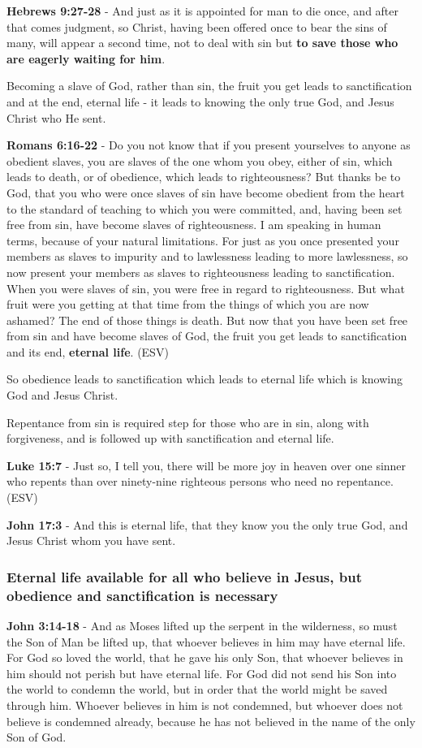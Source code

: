 \documentclass[11pt]{article}
\begin{document}
\textbf{Hebrews 9:27-28} - And just as it is appointed for man to die once, and after that comes judgment, so Christ, having been offered once to bear the sins of many, will appear a second time, not to deal with sin but \textbf{to save those who are eagerly waiting for him}.

Becoming a slave of God, rather than sin, the fruit you get leads to sanctification and at the end, eternal life - it leads to knowing the only true God, and Jesus Christ who He sent.

\textbf{Romans 6:16-22} - Do you not know that if you present yourselves to anyone as obedient slaves, you are slaves of the one whom you obey, either of sin, which leads to death, or of obedience, which leads to righteousness? But thanks be to God, that you who were once slaves of sin have become obedient from the heart to the standard of teaching to which you were committed, and, having been set free from sin, have become slaves of righteousness. I am speaking in human terms, because of your natural limitations. For just as you once presented your members as slaves to impurity and to lawlessness leading to more lawlessness, so now present your members as slaves to righteousness leading to sanctification. When you were slaves of sin, you were free in regard to righteousness. But what fruit were you getting at that time from the things of which you are now ashamed? The end of those things is death. But now that you have been set free from sin and have become slaves of God, the fruit you get leads to sanctification and its end, \textbf{eternal life}. (ESV)

So obedience leads to sanctification which leads to eternal life which is knowing God and Jesus Christ.

Repentance from sin is required step for those who are in sin, along with forgiveness, and is followed up with sanctification and eternal life.

\textbf{Luke 15:7} - Just so, I tell you, there will be more joy in heaven over one sinner who repents than over ninety-nine righteous persons who need no repentance. (ESV)

\textbf{John 17:3} - And this is eternal life, that they know you the only true God, and Jesus Christ whom you have sent.

\subsubsection{Eternal life \textbf{available} for all who believe in Jesus, but obedience and sanctification is necessary}
\label{sec:org819a5ab}
\textbf{John 3:14-18} - And as Moses lifted up the serpent in the wilderness, so must the Son of Man be lifted up, that whoever believes in him may have eternal life. For God so loved the world, that he gave his only Son, that whoever believes in him should not perish but have eternal life. For God did not send his Son into the world to condemn the world, but in order that the world might be saved through him. Whoever believes in him is not condemned, but whoever does not believe is condemned already, because he has not believed in the name of the only Son of God.
\end{document}
